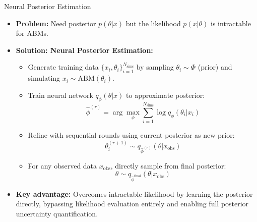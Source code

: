 \documentclass[9pt]{beamer}
\begin{document}
\begin{frame}{Neural Posterior Estimation \citep{dyer_black-box_2024}}
    \begin{itemize}
        \item \textbf{Problem:} Need posterior $p(\theta|x)$ but the likelihood $p(x|\theta)$ is intractable for ABMs.
        \item \textbf{Solution: Neural Posterior Estimation:}
        \begin{itemize}
            \item Generate training data $\{x_i,\theta_i\}_{i=1}^{N_{\text{sims}}}$ by sampling $\theta_i \sim \Phi$ (prior) and simulating $x_i \sim \text{ABM}(\theta_i)$.
            \item Train neural network $q_\phi(\theta|x)$ to approximate posterior:
            \[ \hat{\phi}^{(r)} = \arg\max_\phi \sum_{i=1}^{N_{\text{sims}}} \log q_\phi(\theta_i|x_i) \]
            \item Refine with sequential rounds using current posterior as new prior:
            \[ \theta_i^{(r+1)} \sim q_{\hat{\phi}^{(r)}}(\theta|x_{\text{obs}}) \]
            \item For any observed data $x_{\text{obs}}$, directly sample from final posterior:
            \[ \theta \sim q_{\hat{\phi}^{\text{final}}}(\theta|x_{\text{obs}}) \]
        \end{itemize}
        \item \textbf{Key advantage:} Overcomes intractable likelihood by learning the posterior directly, bypassing likelihood evaluation entirely and enabling full posterior uncertainty quantification.
    \end{itemize}
\end{frame}
\end{document}
